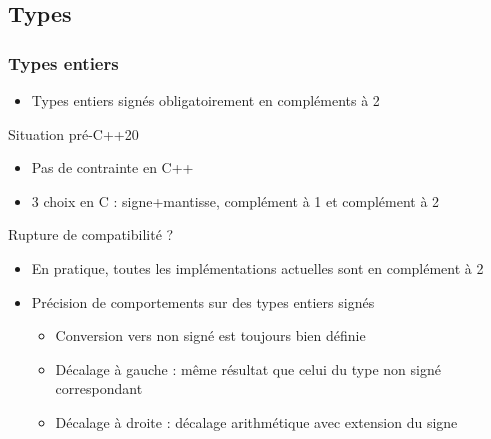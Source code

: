 \documentclass[C++.tex]{subfiles}
\begin{document}
\subsection*{Types}
\begin{frame}[fragile]
	\frametitle{Types entiers}
	\begin{itemize}
		\item Types entiers signés obligatoirement en compléments à 2
	\end{itemize}

	\begin{block}{Situation pré-C++20}
		\begin{itemize}
			\item Pas de contrainte en C++
			\item 3 choix en C : signe+mantisse, complément à 1 et complément à 2
		\end{itemize}
	\end{block}


	\begin{alertblock}{Rupture de compatibilité ?}
		\begin{itemize}
			\item En pratique, toutes les implémentations actuelles sont en complément à 2
		\end{itemize}
	\end{alertblock}

	\begin{itemize}
		\item Précision de comportements sur des types entiers signés
		\begin{itemize}
			\item Conversion vers non signé est toujours bien définie


			\item Décalage à gauche : même résultat que celui du type non signé correspondant
			\item Décalage à droite : décalage arithmétique avec extension du signe
		\end{itemize}
	\end{itemize}
\end{frame}
\end{document}
